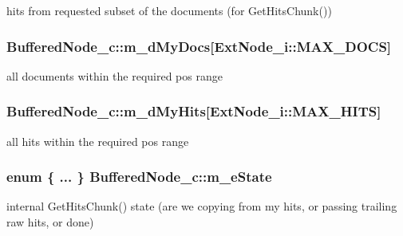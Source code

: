 hits from requested subset of the documents (for Get\-Hits\-Chunk()) 

\hypertarget{classBufferedNode__c_aea81fcd03e7cc64767006f41510d9496}{
\subsubsection[{m\-\_\-d\-My\-Docs}]{ Buffered\-Node\-\_\-c\-::m\-\_\-d\-My\-Docs\mbox{[}{\bf Ext\-Node\-\_\-i\-::\-M\-A\-X\-\_\-\-D\-O\-C\-S}\mbox{]}\hspace{0.3cm}{\ttfamily [protected]}}}\label{classBufferedNode__c_aea81fcd03e7cc64767006f41510d9496}


all documents within the required pos range 

\hypertarget{classBufferedNode__c_a0c0a18060fd9ffb4e0845bc8200925df}{
\subsubsection[{m\-\_\-d\-My\-Hits}]{ Buffered\-Node\-\_\-c\-::m\-\_\-d\-My\-Hits\mbox{[}{\bf Ext\-Node\-\_\-i\-::\-M\-A\-X\-\_\-\-H\-I\-T\-S}\mbox{]}\hspace{0.3cm}{\ttfamily [protected]}}}\label{classBufferedNode__c_a0c0a18060fd9ffb4e0845bc8200925df}


all hits within the required pos range 

\hypertarget{classBufferedNode__c_a4d1a75942ed1b4c2e292910761b548b4}{
\subsubsection[{m\-\_\-e\-State}]{\setlength{\rightskip}{0pt plus 5cm}enum \{ ... \} 							 Buffered\-Node\-\_\-c\-::m\-\_\-e\-State\hspace{0.3cm}{\ttfamily [protected]}}}\label{classBufferedNode__c_a4d1a75942ed1b4c2e292910761b548b4}


internal Get\-Hits\-Chunk() state (are we copying from my hits, or passing trailing raw hits, or done) 

